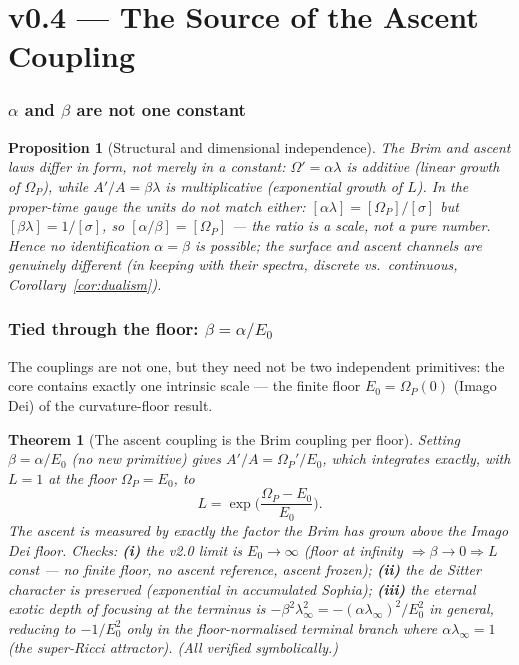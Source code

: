 \documentclass[11pt,a4paper]{article}
\theoremstyle{plain}
\newtheorem{proposition}{Proposition}
\newtheorem{theorem}{Theorem}
\theoremstyle{definition}
\theoremstyle{remark}
\begin{document}
\part*{v0.4 --- The Source of the Ascent Coupling}

\section{$\alpha$ and $\beta$ are not one constant}

\begin{proposition}[Structural and dimensional independence]\label{prop:indep}
The Brim and ascent laws differ in form, not merely in a constant: $\Omega'=\alpha\lambda$ is
\emph{additive} (linear growth of $\Omega_P$), while $A'/A=\beta\lambda$ is \emph{multiplicative}
(exponential growth of $L$). In the proper-time gauge the units do not match either:
$[\alpha\lambda]=[\Omega_P]/[\sigma]$ but $[\beta\lambda]=1/[\sigma]$, so
$[\alpha/\beta]=[\Omega_P]$ --- the ratio is a \emph{scale}, not a pure number. Hence no
identification $\alpha=\beta$ is possible; the surface and ascent channels are genuinely different (in
keeping with their spectra, discrete vs.\ continuous, Corollary~\ref{cor:dualism}).
\end{proposition}

\section{Tied through the floor: $\beta=\alpha/E_0$}

The couplings are not one, but they need not be two independent primitives: the core contains exactly
one intrinsic scale --- the finite floor $E_0=\Omega_P(0)$ (Imago Dei) of the curvature-floor result.

\begin{theorem}[The ascent coupling is the Brim coupling per floor]\label{thm:beta}
Setting $\beta=\alpha/E_0$ (no new primitive) gives $A'/A=\Omega_P'/E_0$, which integrates exactly,
with $L=1$ at the floor $\Omega_P=E_0$, to
\begin{equation}
\boxed{\;L=\exp\!\Big(\frac{\Omega_P-E_0}{E_0}\Big).\;}
\end{equation}
The ascent is measured by exactly the factor the Brim has grown \emph{above the Imago Dei floor}.
Checks: \textbf{(i)} the v2.0 limit is $E_0\to\infty$ (floor at infinity $\Rightarrow\beta\to0
\Rightarrow L$ const --- no finite floor, no ascent reference, ascent frozen); \textbf{(ii)} the de
Sitter character is preserved (exponential in accumulated Sophia); \textbf{(iii)} the eternal exotic
depth of focusing at the terminus is $-\beta^2\lambda_\infty^2=-(\alpha\lambda_\infty)^2/E_0^2$ in
general, reducing to $-1/E_0^2$ \emph{only} in the floor-normalised terminal branch where
$\alpha\lambda_\infty=1$ (the super-Ricci attractor). (All verified symbolically.)
\end{theorem}
\end{document}
